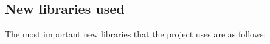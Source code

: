 \documentclass[fontsize=11pt]{article}
\begin{document}






\subsection{New libraries used}

The most important new libraries that the project uses are as follows:
\end{document}
